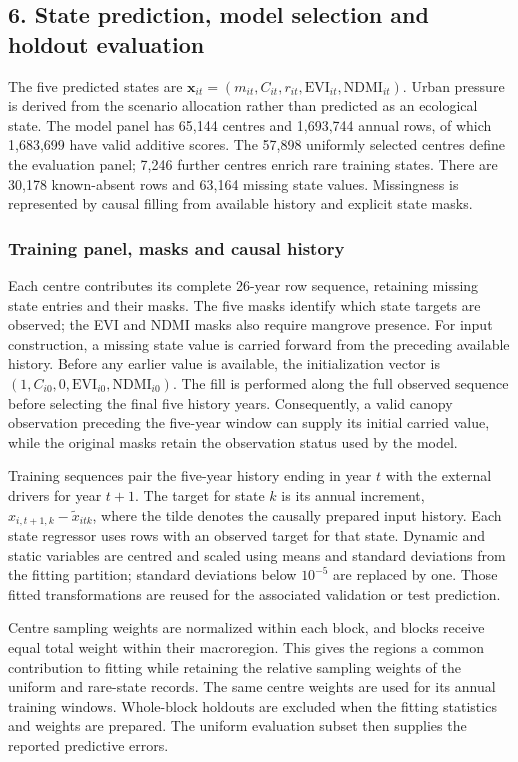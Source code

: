 \subsection{6. State prediction, model selection and holdout evaluation}

The five predicted states are $\mathbf{x}_{it}=(m_{it},C_{it},r_{it},\mathrm{EVI}_{it},\mathrm{NDMI}_{it})$. Urban pressure is derived from the scenario allocation rather than predicted as an ecological state. The model panel has 65,144 centres and 1,693,744 annual rows, of which 1,683,699 have valid additive scores. The 57,898 uniformly selected centres define the evaluation panel; 7,246 further centres enrich rare training states. There are 30,178 known-absent rows and 63,164 missing state values. Missingness is represented by causal filling from available history and explicit state masks.

\subsubsection{Training panel, masks and causal history}
Each centre contributes its complete 26-year row sequence, retaining missing state entries and their masks. The five masks identify which state targets are observed; the EVI and NDMI masks also require mangrove presence. For input construction, a missing state value is carried forward from the preceding available history. Before any earlier value is available, the initialization vector is $(1,C_{i0},0,\mathrm{EVI}_{i0},\mathrm{NDMI}_{i0})$. The fill is performed along the full observed sequence before selecting the final five history years. Consequently, a valid canopy observation preceding the five-year window can supply its initial carried value, while the original masks retain the observation status used by the model.

Training sequences pair the five-year history ending in year $t$ with the external drivers for year $t+1$. The target for state $k$ is its annual increment, $x_{i,t+1,k}-\widetilde{x}_{itk}$, where the tilde denotes the causally prepared input history. Each state regressor uses rows with an observed target for that state. Dynamic and static variables are centred and scaled using means and standard deviations from the fitting partition; standard deviations below $10^{-5}$ are replaced by one. Those fitted transformations are reused for the associated validation or test prediction.

Centre sampling weights are normalized within each block, and blocks receive equal total weight within their macroregion. This gives the regions a common contribution to fitting while retaining the relative sampling weights of the uniform and rare-state records. The same centre weights are used for its annual training windows. Whole-block holdouts are excluded when the fitting statistics and weights are prepared. The uniform evaluation subset then supplies the reported predictive errors.

